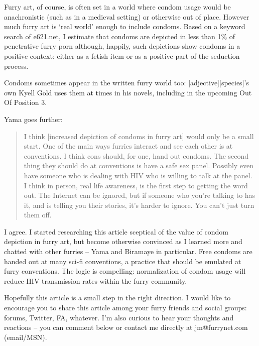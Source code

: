 Furry art, of course, is often set in a world where condom usage would be anachronistic (such as in a medieval setting) or otherwise out of place. However much furry art is ‘real world' enough to include condoms. Based on a keyword search of e621.net, I estimate that condoms are depicted in less than 1\% of penetrative furry porn although, happily, such depictions show condoms in a positive context: either as a fetish item or as a positive part of the seduction process.

Condoms sometimes appear in the written furry world too: [adjective][species]'s own Kyell Gold uses them at times in his novels, including in the upcoming Out Of Position 3.

Yama goes further:

\begin{quote}
  I think [increased depiction of condoms in furry art] would only be a small start. One of the main ways furries interact and see each other is at conventions. I think cons should, for one, hand out condoms. The second thing they should do at conventions is have a safe sex panel. Possibly even have someone who is dealing with HIV who is willing to talk at the panel. I think in person, real life awareness, is the first step to getting the word out. The Internet can be ignored, but if someone who you're talking to has it, and is telling you their stories, it's harder to ignore. You can't just turn them off.
\end{quote}

I agree. I started researching this article sceptical of the value of condom depiction in furry art, but become otherwise convinced as I learned more and chatted with other furries – Yama and Biramaye in particular. Free condoms are handed out at many sci-fi conventions, a practice that should be emulated at furry conventions. The logic is compelling: normalization of condom usage will reduce HIV transmission rates within the furry community.

Hopefully this article is a small step in the right direction. I would like to encourage you to share this article among your furry friends and social groups: forums, Twitter, FA, whatever. I'm also curious to hear your thoughts and reactions – you can comment below or contact me directly at jm@furrynet.com (email/MSN).
